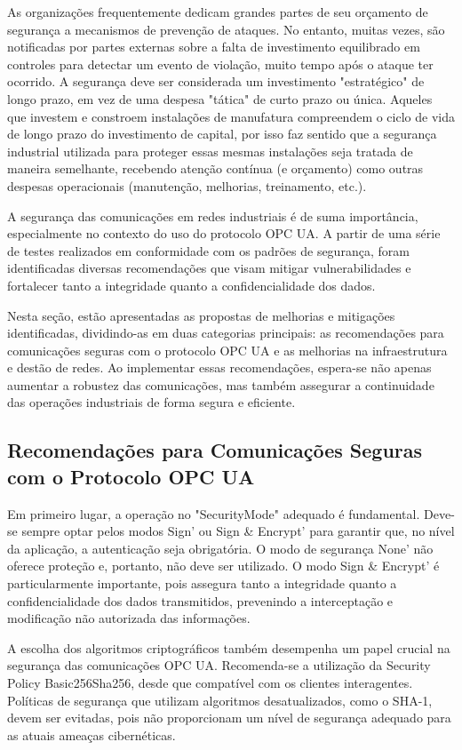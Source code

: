 As organizações frequentemente dedicam grandes partes de seu orçamento de segurança a mecanismos de prevenção de ataques. No entanto, muitas vezes, são notificadas por partes externas sobre a falta de investimento equilibrado em controles para detectar um evento de violação, muito tempo após o ataque ter ocorrido. A segurança deve ser considerada um investimento "estratégico" de longo prazo, em vez de uma despesa "tática" de curto prazo ou única. Aqueles que investem e constroem instalações de manufatura compreendem o ciclo de vida de longo prazo do investimento de capital, por isso faz sentido que a segurança industrial utilizada para proteger essas mesmas instalações seja tratada de maneira semelhante, recebendo atenção contínua (e orçamento) como outras despesas operacionais (manutenção, melhorias, treinamento, etc.).

A segurança das comunicações em redes industriais é de suma importância, especialmente no contexto do uso do protocolo OPC UA. A partir de uma série de testes realizados em conformidade com os padrões de segurança, foram identificadas diversas recomendações que visam mitigar vulnerabilidades e fortalecer tanto a integridade quanto a confidencialidade dos dados.

Nesta seção, estão apresentadas as propostas de melhorias e mitigações identificadas, dividindo-as em duas categorias principais: as recomendações para comunicações seguras com o protocolo OPC UA e as melhorias na infraestrutura e destão de redes. Ao implementar essas recomendações, espera-se não apenas aumentar a robustez das comunicações, mas também assegurar a continuidade das operações industriais de forma segura e eficiente.

\subsection{Recomendações para Comunicações Seguras com o Protocolo OPC UA}

Em primeiro lugar, a operação no "SecurityMode" adequado é fundamental. Deve-se sempre optar pelos modos Sign' ou Sign \& Encrypt' para garantir que, no nível da aplicação, a autenticação seja obrigatória. O modo de segurança None' não oferece proteção e, portanto, não deve ser utilizado. O modo Sign \& Encrypt' é particularmente importante, pois assegura tanto a integridade quanto a confidencialidade dos dados transmitidos, prevenindo a interceptação e modificação não autorizada das informações.

A escolha dos algoritmos criptográficos também desempenha um papel crucial na segurança das comunicações OPC UA. Recomenda-se a utilização da Security Policy Basic256Sha256, desde que compatível com os clientes interagentes. Políticas de segurança que utilizam algoritmos desatualizados, como o SHA-1, devem ser evitadas, pois não proporcionam um nível de segurança adequado para as atuais ameaças cibernéticas.

